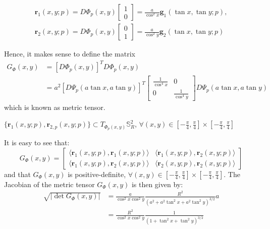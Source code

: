 \begin{align}
	\boldsymbol{r}_{1}(x,y;p) = D\Phi_{p}(x,y)
	\begin{bmatrix}
		 1 \\
		 0
	\end{bmatrix}
	= \frac{a}{\cos^2 x}
	\boldsymbol{g}_{1}(\tan{x}, \tan{y}; p)
	,\\
	\boldsymbol{r}_{2}(x, y ;p) = D\Phi_{p}(x,y)
	\begin{bmatrix}
		 0 \\
		 1
	\end{bmatrix}
	= \frac{a}{\cos^2 y}
	\boldsymbol{g}_{2}(\tan{x}, \tan{y}; p)
\end{align}

Hence, it makes sense to define the matrix 
\begin{align}
	G_{\Phi}(x,y) &= [D\Phi_{p}(x,y)]^TD\Phi_{p}(x,y) \\
	&= a^2
	[D\Psi_{p}(a\tan{x},a\tan{y})]^T
	\begin{bmatrix}
		\frac{1}{\cos^4 x} & 0 \\ 
		0 & \frac{1}{\cos^4 y} 
	\end{bmatrix}
	D\Psi_{p}(a\tan{x}, a\tan{y})
\end{align}
which is known as metric tensor.

$\{\boldsymbol{r}_{1}(x,y;p),\boldsymbol{r}_{2,p}(x,y;p)\} \subset T_{\Phi_p(x,y)}
\mathbb{S}_{R}^2$, $\forall (x,y) \in 
[-\frac{\pi}{4},\frac{\pi}{4}] 
\times [-\frac{\pi}{4},\frac{\pi}{4}]$

It is easy to see that:
\begin{equation}
	\label{chp3-eqangle-phi-metric-tensor}
	G_{\Phi}(x,y) = 
	\begin{bmatrix}
		\langle \boldsymbol{r}_{1}(x,y;p), \boldsymbol{r}_{1}(x,y;p) \rangle & 
		\langle \boldsymbol{r}_{1}(x,y;p), \boldsymbol{r}_{2}(x,y;p) \rangle \\
		\langle \boldsymbol{r}_{1}(x,y;p), \boldsymbol{r}_{2}(x,y;p) \rangle  &
		\langle \boldsymbol{r}_{2}(x,y;p), \boldsymbol{r}_{2}(x,y;p) \rangle 
	\end{bmatrix}
\end{equation}
and that $G_{\Phi}(x,y)$ is positive-definite, 
$\forall (x,y) \in [-\frac{\pi}{4},\frac{\pi}{4}] 
\times [-\frac{\pi}{4},\frac{\pi}{4}]$.
The Jacobian of the metric tensor $G_{\Phi}(x,y)$ is then given by:
\begin{align}
	\sqrt{|\det{G_{\Phi}(x,y)}|} &= \frac{a}{\cos^2 x \cos^2 y}
	\frac{R^2}{(a^2 + a^2\tan^2x + a^2\tan^2y)^{3/2}}a\\
	&= \frac{R^2}{\cos^2 x \cos^2 y}
	\frac{1}{(1 + \tan^2x + \tan^2y)^{3/2}}
\end{align}







